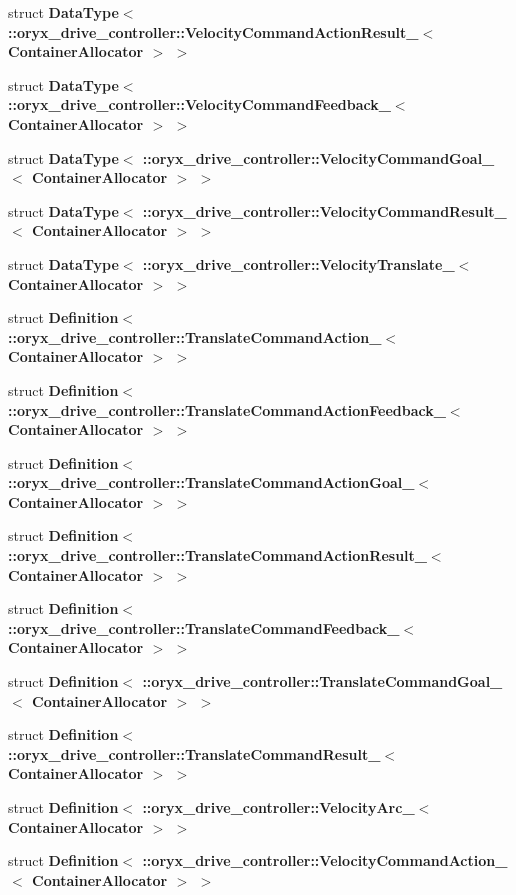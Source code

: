 \begin{DoxyCompactItemize}
\item 
struct {\bf \-Data\-Type$<$ \-::oryx\-\_\-drive\-\_\-controller\-::\-Velocity\-Command\-Action\-Result\-\_\-$<$ Container\-Allocator $>$ $>$}
\item 
struct {\bf \-Data\-Type$<$ \-::oryx\-\_\-drive\-\_\-controller\-::\-Velocity\-Command\-Feedback\-\_\-$<$ Container\-Allocator $>$ $>$}
\item 
struct {\bf \-Data\-Type$<$ \-::oryx\-\_\-drive\-\_\-controller\-::\-Velocity\-Command\-Goal\-\_\-$<$ Container\-Allocator $>$ $>$}
\item 
struct {\bf \-Data\-Type$<$ \-::oryx\-\_\-drive\-\_\-controller\-::\-Velocity\-Command\-Result\-\_\-$<$ Container\-Allocator $>$ $>$}
\item 
struct {\bf \-Data\-Type$<$ \-::oryx\-\_\-drive\-\_\-controller\-::\-Velocity\-Translate\-\_\-$<$ Container\-Allocator $>$ $>$}
\item 
struct {\bf \-Definition$<$ \-::oryx\-\_\-drive\-\_\-controller\-::\-Translate\-Command\-Action\-\_\-$<$ Container\-Allocator $>$ $>$}
\item 
struct {\bf \-Definition$<$ \-::oryx\-\_\-drive\-\_\-controller\-::\-Translate\-Command\-Action\-Feedback\-\_\-$<$ Container\-Allocator $>$ $>$}
\item 
struct {\bf \-Definition$<$ \-::oryx\-\_\-drive\-\_\-controller\-::\-Translate\-Command\-Action\-Goal\-\_\-$<$ Container\-Allocator $>$ $>$}
\item 
struct {\bf \-Definition$<$ \-::oryx\-\_\-drive\-\_\-controller\-::\-Translate\-Command\-Action\-Result\-\_\-$<$ Container\-Allocator $>$ $>$}
\item 
struct {\bf \-Definition$<$ \-::oryx\-\_\-drive\-\_\-controller\-::\-Translate\-Command\-Feedback\-\_\-$<$ Container\-Allocator $>$ $>$}
\item 
struct {\bf \-Definition$<$ \-::oryx\-\_\-drive\-\_\-controller\-::\-Translate\-Command\-Goal\-\_\-$<$ Container\-Allocator $>$ $>$}
\item 
struct {\bf \-Definition$<$ \-::oryx\-\_\-drive\-\_\-controller\-::\-Translate\-Command\-Result\-\_\-$<$ Container\-Allocator $>$ $>$}
\item 
struct {\bf \-Definition$<$ \-::oryx\-\_\-drive\-\_\-controller\-::\-Velocity\-Arc\-\_\-$<$ Container\-Allocator $>$ $>$}
\item 
struct {\bf \-Definition$<$ \-::oryx\-\_\-drive\-\_\-controller\-::\-Velocity\-Command\-Action\-\_\-$<$ Container\-Allocator $>$ $>$}
\item 

\end{DoxyCompactItemize}
